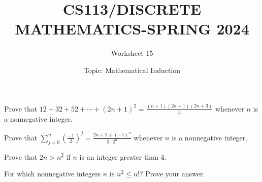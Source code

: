 \documentclass{exam}
\title{CS113/DISCRETE MATHEMATICS-SPRING 2024}
\author{Worksheet 15}
\date{Topic: Mathematical Induction}
\begin{document}
\maketitle

\begin{center}
\end{center}

\vspace{5mm}

\vspace{5mm}


\vspace{5mm}
\begin{questions}

\question
Prove that $12 + 32 + 52 + \cdots + (2n + 1)^2 = \frac{{(n + 1)(2n + 1)(2n + 3)}}{3}$ whenever $n$ is a nonnegative integer.


\vspace{9in}



\question Prove that $\displaystyle\sum_{j=0}^{n}\left(\frac{-1}{2}\right)^j = \frac{2n+1 + (-1)^n}{3\cdot 2^n}$ whenever $n$ is a nonnegative integer.
\vspace{9in}

\question Prove that $2n > n^2$ if $n$ is an integer greater than 4.
\vspace{9in}

\question For which nonnegative integers $n$ is $n^2 \leq n!$? Prove your answer.
\vspace{9in}



\end{questions}
\end{document}
